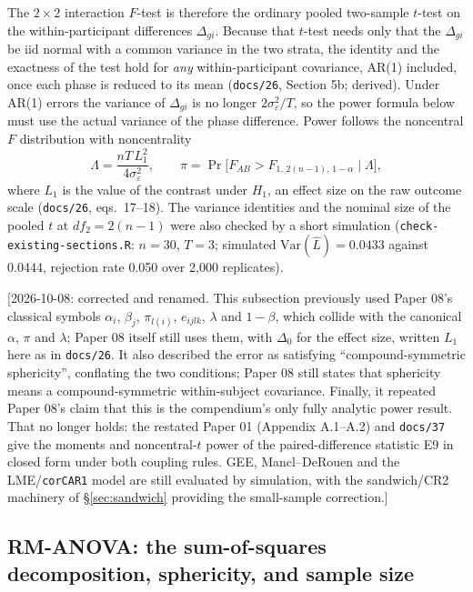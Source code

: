 \documentclass[11pt]{article}
\newcommand{\note}[1]{\textcolor{blue!60!black}{\small [#1]}}
\newcommand{\code}[1]{\texttt{#1}}
\begin{document}
The $2\times2$ interaction $F$-test is therefore the ordinary pooled
two-sample $t$-test on the within-participant differences
$\Delta_{gi}$. Because that $t$-test needs only that the $\Delta_{gi}$
be iid normal with a common variance in the two strata, the identity
and the exactness of the test hold for \emph{any} within-participant
covariance, AR(1) included, once each phase is reduced to its mean
(\code{docs/26}, Section 5b; derived). Under AR(1) errors the variance
of $\Delta_{gi}$ is no longer $2\sigma_\varepsilon^2/T$, so the power
formula below must use the actual variance of the phase difference.
Power follows the noncentral $F$ distribution with noncentrality
\begin{equation}
\Lambda = \frac{nT\,L_1^2}{4\sigma_\varepsilon^2}, \qquad \pi =
  \Pr\!\big[F_{AB} > F_{1,\,2(n-1),\,1-\alpha} \mid \Lambda\big],
\label{eq:rmanova-power}
\end{equation}
where $L_1$ is the value of the contrast under $H_1$, an effect size
on the raw outcome scale (\code{docs/26}, eqs.~17--18). The variance
identities and the nominal size of the pooled $t$ at $df_2 = 2(n-1)$
were also checked by a short simulation (\code{check-existing-sections.R}:
$n = 30$, $T = 3$; simulated $\mathrm{Var}(\hat L) = 0.0433$ against
0.0444, rejection rate 0.050 over 2{,}000 replicates).

\note{2026-10-08: corrected and renamed. This subsection previously
used Paper 08's classical symbols $\alpha_i$, $\beta_j$, $\pi_{l(i)}$,
$e_{ijlk}$, $\lambda$ and $1-\beta$, which collide with the canonical
$\alpha$, $\pi$ and $\lambda$; Paper 08 itself still uses them, with
$\Delta_0$ for the effect size, written $L_1$ here as in
\code{docs/26}. It also described the error as satisfying
``compound-symmetric sphericity'', conflating the two conditions; Paper
08 still states that sphericity means a compound-symmetric
within-subject covariance. Finally, it repeated Paper 08's claim that
this is the compendium's only fully analytic power result. That no
longer holds: the restated Paper 01 (Appendix A.1--A.2) and
\code{docs/37} give the moments and noncentral-$t$ power of the
paired-difference statistic E9 in closed form under both coupling
rules. GEE, Mancl--DeRouen and the LME/\code{corCAR1} model are still
evaluated by simulation, with the sandwich/CR2 machinery of
\S\ref{sec:sandwich} providing the small-sample correction.}

\subsection{RM-ANOVA: the sum-of-squares decomposition, sphericity, and
sample size}
\label{sec:invb-rmanova-ss}
\end{document}
